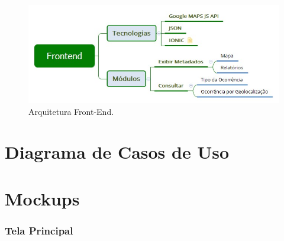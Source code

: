 \documentclass[
	12pt,				%
	openright,			%
	twoside,			%
	a4paper,			%
	english,			%
	french,				%
	spanish,			%
	brazil,				%
	]{abntex2}
\begin{document}
\begin{figure}[h]
	\caption{\label{frontend_figura}Arquitetura Front-End.}
	\begin{center}
		\includegraphics[scale=0.6]{figuras/arquitetura-frontend.jpeg}
	\end{center}
\end{figure}

\chapter{Diagrama de Casos de Uso}

\chapter{Mockups}

\subsection{Tela Principal}
\end{document}
